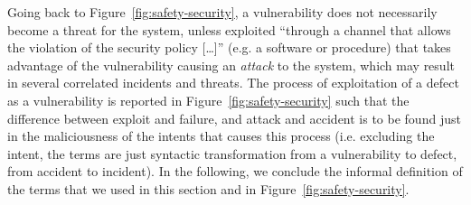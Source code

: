 Going back to Figure~\ref{fig:safety-security}, a vulnerability does not
necessarily become a threat for the system, unless exploited ``through a
channel that allows the violation of the security policy
[\ldots]''\autocite{cnssi20104009} (e.g. a software or procedure) that takes
advantage of the vulnerability causing an \emph{attack} to the system, which may
result in several correlated incidents and threats.  The process of
exploitation of a defect as a vulnerability is reported in
Figure~\ref{fig:safety-security} such that the difference between exploit and failure,
and attack and accident is to be found just in the maliciousness of the intents
that causes this process (i.e. excluding the intent, the terms are just syntactic transformation from a vulnerability to defect, from
accident to incident). In the following, we conclude the informal definition of
the terms that we used in this section and in Figure~\ref{fig:safety-security}.

